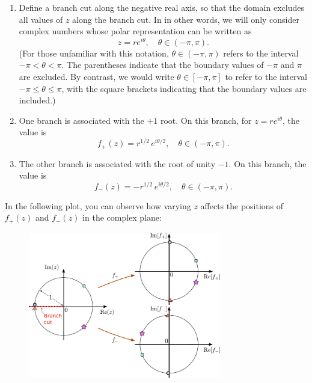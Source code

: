 \documentclass[10pt,a4paper]{article}
\begin{document}
\begin{enumerate}
\item 
Define a branch cut along the negative real axis, so that the domain
excludes all values of $z$ along the branch cut. In in other words, we
will only consider complex numbers whose polar representation can be
written as
\begin{equation}
z = r e^{i\theta}, \quad \theta \in (-\pi, \pi).
\end{equation}
(For those unfamiliar with this notation, $\theta \in (-\pi, \pi)$
refers to the interval $-\pi < \theta < \pi$. The parentheses indicate
that the boundary values of $-\pi$ and $\pi$ are excluded. By
contrast, we would write $\theta \in [-\pi, \pi]$ to refer to the
interval $-\pi \le \theta \le \pi$, with the square brackets
indicating that the boundary values are included.)

\item
  One branch is associated with the $+1$ root. On this branch, for $z
  = re^{i\theta}$, the value is
  \begin{equation}
    f_+(z) = r^{1/2} \, e^{i\theta/2}, \quad \theta \in (-\pi, \pi).
  \end{equation}

\item
  The other branch is associated with the root of unity $-1$. On this
  branch, the value is
\begin{equation}
f_-(z) = -r^{1/2} \, e^{i\theta/2}, \quad \theta \in (-\pi, \pi).
\end{equation}
\end{enumerate}

\noindent
In the following plot, you can observe how varying $z$ affects the
positions of $f_+(z)$ and $f_-(z)$ in the complex plane:

\begin{figure}[h]
  \centering\includegraphics[width=0.75\textwidth]{complex_root_1}
\end{figure}
\end{document}
